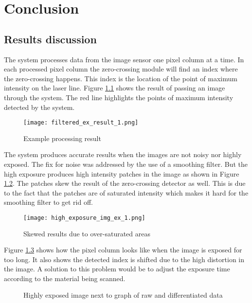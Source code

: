 \chapter{Conclusion}

\section{Results discussion}

The system processes data from the image sensor one pixel column at a time. In each processed pixel column the zero-crossing module will find an index where the zero-crossing happens. This index is the location of the point of maximum intensity on the laser line. Figure \ref{fig:filtered_ex_result_1} shows the result of passing an image through the system. The red line highlights the points of maximum intensity detected by the system.


\begin{figure}[h]
    \centering
    \texttt{[image: filtered\_ex\_result\_1.png]}
    \caption{Example processing result}
    \label{fig:filtered_ex_result_1}
\end{figure}


The system produces accurate results when the images are not noisy nor highly exposed. The fix for noise was addressed by the use of a smoothing filter. But the high exposure produces high intensity patches in the image as shown in Figure \ref{fig:high_exposure_img_ex_1}. The patches skew the result of the zero-crossing detector as well. This is due to the fact that the patches are of saturated intensity which makes it hard for the smoothing filter to get rid off.


\begin{figure}[h]
    \centering
    \texttt{[image: high\_exposure\_img\_ex\_1.png]}
    \caption{Skewed results due to over-saturated areas}
    \label{fig:high_exposure_img_ex_1}
\end{figure}


Figure \ref{fig:high_exposure_img_ex_2} shows how the pixel column looks like when the image is exposed for too long. It also shows the detected index is shifted due to the high distortion in the image. A solution to this problem would be to adjust the exposure time according to the material being scanned.


\begin{figure}[h]
    \centering
    
    \caption{Highly exposed image next to graph of raw and differentiated data}
    \label{fig:high_exposure_img_ex_2}
\end{figure}




